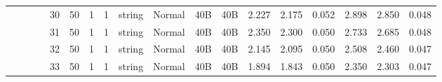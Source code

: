 \begin{landscape}
\begin{table}[]
{\begin{tabular}{@{}ccccllllllllllllll@{}}
                                                                                   &                              &                                &                                                                                                          & 30                                                    & 50                                       & 1                                          & 1                                 & string                           & Normal                             & 40B                                           & 40B                                             & 2.227                   & 2.175    & 0.052                        & 2.898                   & 2.850    & 0.048                        \\
                                                                                   &                              &                                &                                                                                                          & 31                                                    & 50                                       & 1                                          & 1                                 & string                           & Normal                             & 40B                                           & 40B                                             & 2.350                   & 2.300    & 0.050                        & 2.733                   & 2.685    & 0.048                        \\
                                                                                   &                              &                                &                                                                                                          & 32                                                    & 50                                       & 1                                          & 1                                 & string                           & Normal                             & 40B                                           & 40B                                             & 2.145                   & 2.095    & 0.050                        & 2.508                   & 2.460    & 0.047                        \\
                                                                                   &                              &                                &                                                                                                          & 33                                                    & 50                                       & 1                                          & 1                                 & string                           & Normal                             & 40B                                           & 40B                                             & 1.894                   & 1.843    & 0.050                        & 2.350                   & 2.303    & 0.047                        \\

\end{tabular}}
\end{table}
\end{landscape}
